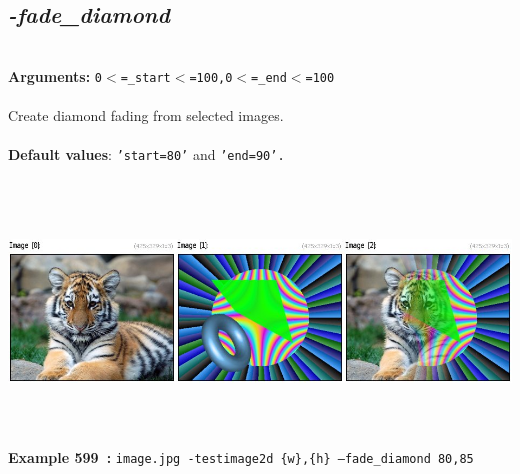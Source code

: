 \documentclass[a4paper,11pt,twoside]{book}
\begin{document}
\subsection{\emph{-fade\_diamond} }\vspace*{-0.5em}
~\\\textbf{Arguments: } 
{\small \texttt{0$<$=\_start$<$=100,0$<$=\_end$<$=100}}\\~\\
Create diamond fading from selected images.
~\\~\\\textbf{Default values}: {\small \texttt{'start=80'} and \texttt{'end=90'.}}
\begin{center}\includegraphics[keepaspectratio=true,height=7cm,width=\textwidth]{img/gmic_def599.jpg}\\
{\footnotesize \textbf{Example 599~:} \texttt{image.jpg -testimage2d \{w\},\{h\} --fade\_diamond 80,85}}
\end{center}
\end{document}
